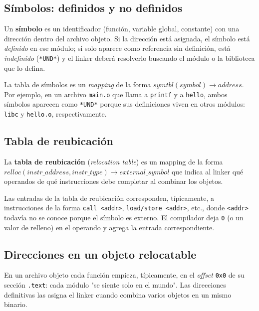 \documentclass[11pt,a4paper]{article}
\begin{document}
\subsection{Símbolos: definidos y no definidos}

\begin{definicion}
Un \textbf{símbolo} es un identificador (función, variable global,
constante) con una dirección dentro del archivo objeto. Si la
dirección está asignada, el símbolo está \emph{definido} en ese
módulo; si solo aparece como referencia sin definición, está
\emph{indefinido} (\texttt{*UND*}) y el linker deberá resolverlo
buscando el módulo o la biblioteca que lo defina.
\end{definicion}

La tabla de símbolos es un \emph{mapping} de la forma
$\textit{symtbl}(\textit{symbol}) \to \textit{address}$. Por ejemplo,
en un archivo \texttt{main.o} que llama a \texttt{printf} y a
\texttt{hello}, ambos símbolos aparecen como \texttt{*UND*} porque
sus definiciones viven en otros módulos: \texttt{libc} y
\texttt{hello.o}, respectivamente.

\subsection{Tabla de reubicación}

\begin{definicion}
La \textbf{tabla de reubicación} (\emph{relocation table}) es un
mapping de la forma
$\textit{relloc}(\textit{instr\_address}, \textit{instr\_type}) \to
\textit{external\_symbol}$ que indica al linker qué operandos de qué
instrucciones debe completar al combinar los objetos.
\end{definicion}

Las entradas de la tabla de reubicación corresponden, típicamente, a
instrucciones de la forma \texttt{call <addr>}, \texttt{load/store
<addr>}, etc., donde \texttt{<addr>} todavía no se conoce porque el
símbolo es externo. El compilador deja \texttt{0} (o un valor de
relleno) en el operando y agrega la entrada correspondiente.

\subsection{Direcciones en un objeto relocatable}

En un archivo objeto cada función empieza, típicamente, en el
\emph{offset} \texttt{0x0} de su sección \texttt{.text}: cada módulo
"se siente solo en el mundo". Las direcciones definitivas las asigna
el linker cuando combina varios objetos en un mismo binario.
\end{document}
